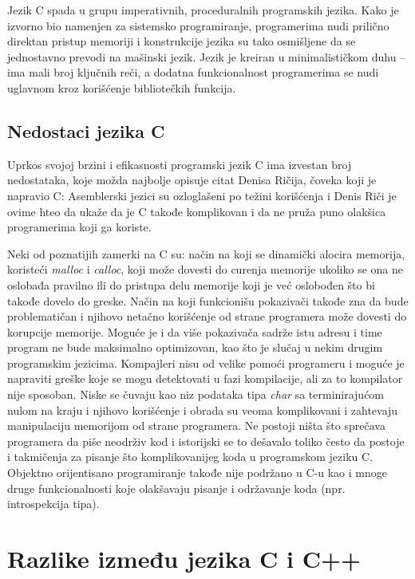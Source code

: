 \documentclass[a4paper]{article}
\begin{document}
{Jezik C spada u grupu imperativnih, proceduralnih programskih jezika. Kako je izvorno bio namenjen za sistemsko programiranje, programerima nudi prilično direktan pristup memoriji i konstrukcije jezika su tako osmišljene da se jednostavno prevodi na mašinski jezik. Jezik je kreiran u minimalističkom duhu -- ima mali broj ključnih reči, a dodatna funkcionalnost programerima se nudi uglavnom kroz korišćenje bibliotečkih funkcija.

\subsection{Nedostaci jezika C}
Uprkos svojoj brzini i efikasnosti programski jezik C ima izvestan broj nedostataka, koje možda najbolje opisuje citat Denisa Ričija, čoveka koji je napravio C:  Asemblerski jezici su ozloglašeni po težini korišćenja i Denis Riči je ovime hteo da ukaže da je C takođe komplikovan i da ne pruža puno olakšica programerima koji ga koriste.

Neki od poznatijih zamerki na C su: način na koji se dinamički alocira memorija, koristeći {\em malloc} i {\em calloc}, koji može dovesti do curenja memorije ukoliko se ona ne oslobađa pravilno ili do pristupa delu memorije koji je već oslobođen što bi takođe dovelo do greske. Način na koji funkcionišu pokazivači takođe zna da bude problematičan i njihovo netačno korišćenje od strane programera može dovesti do korupcije memorije. Moguće je i da više pokazivača sadrže istu adresu i time program ne bude maksimalno optimizovan, kao što je slučaj u nekim drugim programskim jezicima. Kompajleri nisu od velike pomoći programeru i moguće je napraviti greške koje se mogu detektovati u fazi kompilacije, ali za to kompilator nije sposoban. Niske se čuvaju kao niz podataka tipa {\em char} sa terminirajućom nulom na kraju i njihovo korišćenje i obrada su veoma komplikovani i zahtevaju manipulaciju memorijom od strane programera. Ne postoji ništa što sprečava programera da piše neodrživ kod i istorijski se to dešavalo toliko često da postoje i takmičenja za pisanje što komplikovanijeg koda u programskom jeziku C. Objektno orijentisano programiranje takođe nije podržano u C-u kao i mnoge druge funkcionalnosti koje olakšavaju pisanje i održavanje koda (npr. introspekcija tipa).

\section{Razlike između jezika C i C++}

}
\end{document}
